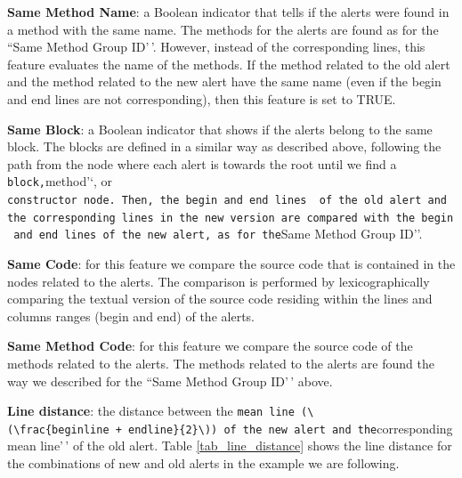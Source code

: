 \documentclass[
]{article}
\begin{document}
\noindent \textbf{Same Method Name}: a Boolean indicator that tells if
the alerts were found in a method with the same name. The methods for
the alerts are found as for the ``Same Method Group ID'\,'. However,
instead of the corresponding lines, this feature evaluates the name of
the methods. If the method related to the old alert and the method
related to the new alert have the same name (even if the begin and end
lines are not corresponding), then this feature is set to TRUE.

\noindent \textbf{Same Block}: a Boolean indicator that shows if the
alerts belong to the same block. The blocks are defined in a similar way
as described above, following the path from the node where each alert is
towards the root until we find a
\texttt{block\textquotesingle{}\textquotesingle{},}method'`, or
\texttt{constructor\textquotesingle{}\textquotesingle{}\ node.\ Then,\ the\ begin\ and\ end\ lines\ \ of\ the\ old\ alert\ and\ the\ corresponding\ lines\ in\ the\ new\ version\ are\ compared\ with\ the\ begin\ and\ end\ lines\ of\ the\ new\ alert,\ as\ for\ the}Same
Method Group ID''.

\noindent \textbf{Same Code}: for this feature we compare the source
code that is contained in the nodes related to the alerts. The
comparison is performed by lexicographically comparing the textual
version of the source code residing within the lines and columns ranges
(begin and end) of the alerts.

\noindent \textbf{Same Method Code}: for this feature we compare the
source code of the methods related to the alerts. The methods related to
the alerts are found the way we described for the ``Same Method Group
ID'\,' above.

\noindent \textbf{Line distance}: the distance between the
\texttt{mean\ line\textquotesingle{}\textquotesingle{}\ (\textbackslash{}(\textbackslash{}frac\{beginline\ +\ endline\}\{2\}\textbackslash{}))\ of\ the\ new\ alert\ and\ the}corresponding
mean line'\,' of the old alert. Table \ref{tab_line_distance} shows the
line distance for the combinations of new and old alerts in the example
we are following.

\small
\end{document}
